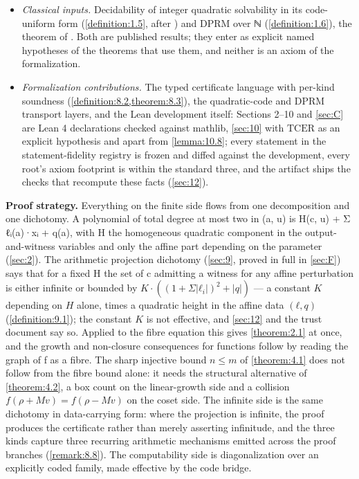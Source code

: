 \begin{itemize}
\item \emph{Classical inputs.} Decidability of integer quadratic solvability in its code-uniform form (\cref{definition:1.5}, after \cite{GS04}) and DPRM over ℕ (\cref{definition:1.6}), the theorem of \cite{DPR61,Mat70}. Both are published results; they enter as explicit named hypotheses of the theorems that use them, and neither is an axiom of the formalization.
\item \emph{Formalization contributions.} The typed certificate language with per-kind soundness (\cref{definition:8.2,theorem:8.3}), the quadratic-code and DPRM transport layers, and the Lean development itself: Sections 2–10 and \cref{sec:C} are Lean 4 declarations checked against mathlib, \cref{sec:10} with $\mathrm{TCER}$ as an explicit hypothesis and apart from \cref{lemma:10.8}; every statement in the statement-fidelity registry is frozen and diffed against the development, every root's axiom footprint is within the standard three, and the artifact ships the checks that recompute these facts (\cref{sec:12}).
\end{itemize}

\textbf{Proof strategy.} Everything on the finite side flows from one decomposition and one dichotomy. A polynomial of total degree at most two in (a, u) is H(c, u) + Σ ℓᵢ(a)·xᵢ + q(a), with H the homogeneous quadratic component in the output-and-witness variables and only the affine part depending on the parameter (\cref{sec:2}). The arithmetic projection dichotomy (\cref{sec:9}, proved in full in \cref{sec:F}) says that for a fixed H the set of c admitting a witness for any affine perturbation is either infinite or bounded by $K·((1 + Σ|ℓ_{i}|)^{2} + |q|)$ — a constant $K$ depending on $H$ alone, times a quadratic height in the affine data $(ℓ, q)$ (\cref{definition:9.1}); the constant $K$ is not effective, and \cref{sec:12} and the trust document say so. Applied to the fibre equation this gives \cref{theorem:2.1} at once, and the growth and non-closure consequences for functions follow by reading the graph of f as a fibre. The sharp injective bound $n ≤ m$ of \cref{theorem:4.1} does not follow from the fibre bound alone: it needs the structural alternative of \cref{theorem:4.2}, a box count on the linear-growth side and a collision $f(ρ + Mv) = f(ρ − Mv)$ on the coset side. The infinite side is the same dichotomy in data-carrying form: where the projection is infinite, the proof produces the certificate rather than merely asserting infinitude, and the three kinds capture three recurring arithmetic mechanisms emitted across the proof branches (\cref{remark:8.8}). The computability side is diagonalization over an explicitly coded family, made effective by the code bridge.

